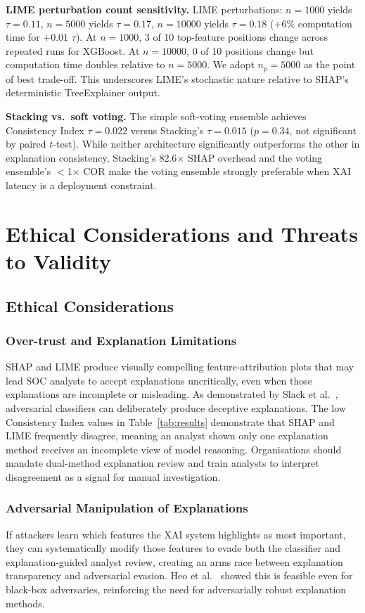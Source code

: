 \documentclass[conference]{IEEEtran}
\begin{document}
\textbf{LIME perturbation count sensitivity.} LIME perturbations: $n=1000$ yields $\tau=0.11$, $n=5000$ yields $\tau=0.17$, $n=10000$ yields $\tau=0.18$ ($+6\%$ computation time for $+0.01$ $\tau$). At $n=1000$, 3 of 10 top-feature positions change across repeated runs for XGBoost. At $n=10000$, 0 of 10 positions change but computation time doubles relative to $n=5000$. We adopt $n_p=5000$ as the point of best trade-off. This underscores LIME's stochastic nature relative to SHAP's deterministic TreeExplainer output.

\textbf{Stacking vs.\ soft voting.} The simple soft-voting ensemble achieves Consistency Index $\tau=0.022$ versus Stacking's $\tau=0.015$ ($p=0.34$, not significant by paired $t$-test). While neither architecture significantly outperforms the other in explanation consistency, Stacking's 82.6$\times$ SHAP overhead and the voting ensemble's $<$1$\times$ COR make the voting ensemble strongly preferable when XAI latency is a deployment constraint.

\section{Ethical Considerations and Threats to Validity}

\subsection{Ethical Considerations}

\subsubsection{Over-trust and Explanation Limitations}
SHAP and LIME produce visually compelling feature-attribution plots that may lead SOC analysts to accept explanations uncritically, even when those explanations are incomplete or misleading. As demonstrated by Slack et al.\ \cite{slack2020}, adversarial classifiers can deliberately produce deceptive explanations. The low Consistency Index values in Table~\ref{tab:results} demonstrate that SHAP and LIME frequently disagree, meaning an analyst shown only one explanation method receives an incomplete view of model reasoning. Organisations should mandate dual-method explanation review and train analysts to interpret disagreement as a signal for manual investigation.

\subsubsection{Adversarial Manipulation of Explanations}
If attackers learn which features the XAI system highlights as most important, they can systematically modify those features to evade both the classifier and explanation-guided analyst review, creating an arms race between explanation transparency and adversarial evasion. Heo et al.\ \cite{heo2019} showed this is feasible even for black-box adversaries, reinforcing the need for adversarially robust explanation methods.
\end{document}
